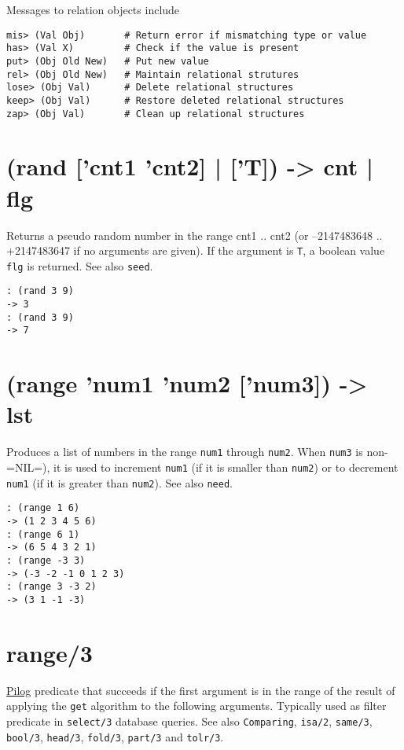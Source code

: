 {{{{{{{{Messages to relation objects include


\begin{verbatim}
mis> (Val Obj)       # Return error if mismatching type or value
has> (Val X)         # Check if the value is present
put> (Obj Old New)   # Put new value
rel> (Obj Old New)   # Maintain relational strutures
lose> (Obj Val)      # Delete relational structures
keep> (Obj Val)      # Restore deleted relational structures
zap> (Obj Val)       # Clean up relational structures
\end{verbatim}

 
\section{(rand ['cnt1 'cnt2] | ['T]) -> cnt | flg}
\label{sec-8-1-18-5}


Returns a pseudo random number in the range cnt1 .. cnt2 (or
--2147483648 .. +2147483647 if no arguments are given). If the argument
is \texttt{T}, a boolean value \texttt{flg} is returned. See also \texttt{seed}.


\begin{verbatim}
: (rand 3 9)
-> 3
: (rand 3 9)
-> 7
\end{verbatim}

 
\section{(range 'num1 'num2 ['num3]) -> lst}
\label{sec-8-1-18-6}


Produces a list of numbers in the range \texttt{num1} through \texttt{num2}. When
\texttt{num3} is non-=NIL=), it is used to increment \texttt{num1} (if it is smaller
than \texttt{num2}) or to decrement \texttt{num1} (if it is greater than \texttt{num2}). See
also \texttt{need}.


\begin{verbatim}
: (range 1 6)
-> (1 2 3 4 5 6)
: (range 6 1)
-> (6 5 4 3 2 1)
: (range -3 3)
-> (-3 -2 -1 0 1 2 3)
: (range 3 -3 2)
-> (3 1 -1 -3)
\end{verbatim}

 
\section{range/3}
\label{sec-8-1-18-7}


\hyperref[ref.html-pilog]{Pilog} predicate that succeeds if the first argument
is in the range of the result of applying the \texttt{get} algorithm to the
following arguments. Typically used as filter predicate in \texttt{select/3}
database queries. See also \texttt{Comparing}, \texttt{isa/2}, \texttt{same/3}, \texttt{bool/3},
\texttt{head/3}, \texttt{fold/3}, \texttt{part/3} and \texttt{tolr/3}.


}}}}}}}}
